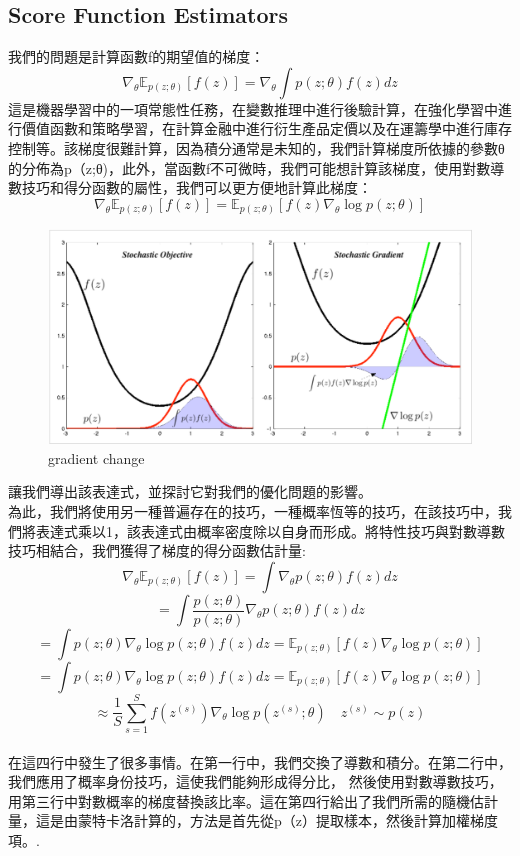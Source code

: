 \documentclass[14pt,a4paper]{report}  %
\begin{document}
\subsection{Score Function Estimators}
我們的問題是計算函數f的期望值的梯度：\\
$$\nabla_\theta \mathbb{E}_{p(z;\theta)}[f(z)] =\nabla_\theta \int p(z; \theta)f(z) dz$$
 這是機器學習中的一項常態性任務，在變數推理中進行後驗計算，在強化學習中進行價值函數和策略學習，在計算金融中進行衍生產品定價以及在運籌學中進行庫存控制等。該梯度很難計算，因為積分通常是未知的，我們計算梯度所依據的參數θ的分佈為p（z;θ)，此外，當函數f不可微時，我們可能想計算該梯度，使用對數導數技巧和得分函數的屬性，我們可以更方便地計算此梯度：\\
$$\nabla_\theta \mathbb{E}_{p(z;\theta)}[f(z)] = \mathbb{E}_{p(z;\theta)}[f(z)\nabla_\theta \log p(z;\theta)]$$
\begin{figure}[hbt!]
\begin{center}
\includegraphics[scale=0.5]{gradient_change}
\caption{gradient change}
\end{center}
\end{figure}
 讓我們導出該表達式，並探討它對我們的優化問題的影響。\\
 為此，我們將使用另一種普遍存在的技巧，一種概率恆等的技巧，在該技巧中，我們將表達式乘以1，該表達式由概率密度除以自身而形成。將特性技巧與對數導數技巧相結合，我們獲得了梯度的得分函數估計量:\\
$$\nabla_\theta \mathbb{E}_{p(z;\theta)}[f(z)]=\int\nabla_\theta p(z;\theta)f(z) dz$$
$$= \int \frac{p(z;\theta)}{p(z;\theta)}\nabla_\theta p(z;\theta)f(z) dz$$
$$=\int p(z;\theta)\nabla_\theta \log p(z;\theta)f(z) dz = \mathbb{E}_{p(z;\theta)}[f(z)\nabla_\theta \log p(z;\theta)]$$
$$=\int p(z;\theta)\nabla_\theta \log p(z;\theta)f(z) dz = \mathbb{E}_{p(z;\theta)}[f(z)\nabla_\theta \log p(z;\theta)]$$
$$\approx \frac{1}{S} \sum_{s=1}^{S}f(z^{(s)})\nabla_\theta \log p(z^{(s)};\theta) \quad z^{(s)}\sim p(z)$$\\
在這四行中發生了很多事情。在第一行中，我們交換了導數和積分。在第二行中，我們應用了概率身份技巧，這使我們能夠形成得分比， 然後使用對數導數技巧，用第三行中對數概率的梯度替換該比率。這在第四行給出了我們所需的隨機估計量，這是由蒙特卡洛計算的，方法是首先從p（z）提取樣本，然後計算加權梯度項。.\\
\end{document}
